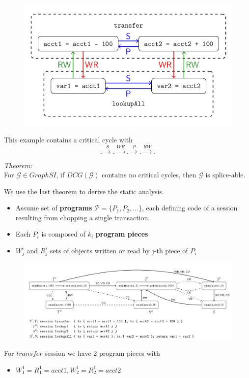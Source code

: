 \documentclass{beamer}
\begin{document}
\begin{frame}
\begin{figure}
	\includegraphics[scale=0.35]{fig5a}
\end{figure}
This example contains a critical cycle with $$.\xrightarrow{S}.\xrightarrow{WR}.\xrightarrow{P}.\xrightarrow{RW}.$$
\end{frame}


\begin{frame}
	\textit{Theorem:} \\
	For $\mathcal{G} \in GraphSI$, if $DCG(\mathcal{G})$ contains no critical cycles, then $\mathcal{G}$ is splice-able.
\end{frame}


\begin{frame}
We use the last theorem to derive the static analysis.
\begin{itemize}
	\item Assume set of \textbf{programs} $\mathcal{P}=\{P_1, P_2, \dots\}$, each defining code of a session resulting from chopping a single transaction.
	\item Each $P_i$ is composed of $k_i$ \textbf{program pieces}
	\item $W^i_j$ and $R^i_j$ sets of objects written or read by j-th piece of $P_i$ 
\end{itemize}
\end{frame}

\begin{frame}
\begin{figure}
\includegraphics[scale=0.28]{fig4}
\end{figure}
For $transfer$ session we have 2 program pieces with
\begin{itemize}
\item $W^1_1 = R^1_1 = {acct1}, W^1_2 = R^1_2 = {acct2}$
\end{itemize}
\end{frame}
\end{document}
